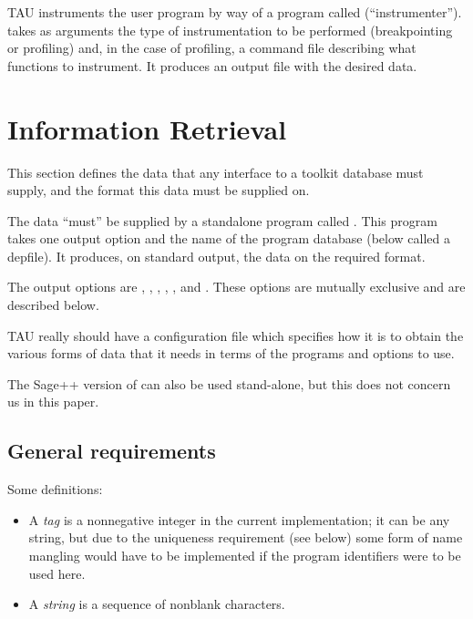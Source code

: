 TAU instruments the user program by way of a program called 
(``instrumenter'').  takes as arguments the type of
instrumentation to be performed (breakpointing or profiling) and, in the
case of profiling, a command file describing what functions to
instrument. It produces an output file with the desired data.

\section{Information Retrieval}
\label{cgm}

This section defines the data that any interface to a toolkit database
must supply, and the format this data must be supplied on.

The data ``must'' be supplied by a standalone program called
. This program takes one output option and the name of the
program database (below called a depfile). It produces, on standard
output, the data on the required format.

The output options are , , ,
, , and .
These options are mutually exclusive and are described below.

TAU really should have a configuration file which specifies how it is
to obtain the various forms of data that it needs in terms of the programs
and options to use.

The Sage++ version of  can also be used stand-alone, but this does
not concern us in this paper.

\subsection{General requirements}

Some definitions:
\begin{itemize}
\item A {\em tag} is a nonnegative integer in the current implementation;
      it can be any string, but due to the uniqueness requirement (see
      below) some form of name mangling would have to be implemented if
      the program identifiers were to be used here.
\item A {\em string} is a sequence of nonblank characters.
\end{itemize}

